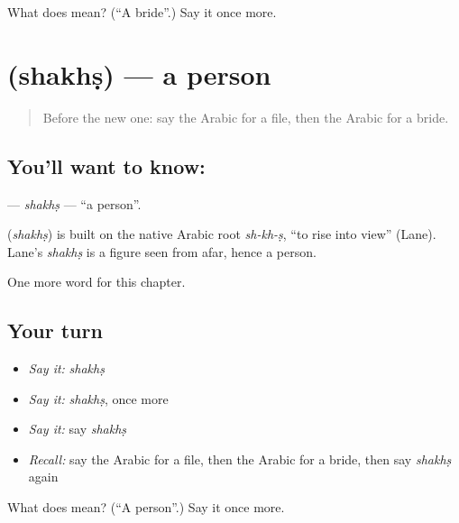 \begin{tcolorbox}[breakable,colback=teal!4,colframe=teal!35!black,title={Before you move on}]
What does  mean? (\textquotedblleft{}A bride\textquotedblright{}.) Say it once more.
\end{tcolorbox}
\section[\texorpdfstring{\ar{شخص} (shakhṣ)}{شخص (shakhṣ)}]{ (shakhṣ) — a person}

\label{lesson:AR-C275-shakhs}



\begin{quote}
Before the new one: say the Arabic for a file, then the Arabic for a bride.
\end{quote}

\subsection*{You'll want to know: }
\textbf{} — \emph{shakhṣ} — \textquotedblleft{}a person\textquotedblright{}.

\begin{cousinweb}
\textbf{} (\emph{shakhṣ}) is built on the native Arabic root \emph{sh-kh-ṣ}, \textquotedblleft{}to rise into view\textquotedblright{} (Lane). Lane's \emph{shakhṣ} is a figure seen from afar, hence a person.
\end{cousinweb}

\begin{grammarlens}[title={What you've built}]
One more word for this chapter.
\end{grammarlens}

\subsection*{Your turn}
\begin{itemize}
\raggedright
  \item \emph{Say it:} \emph{shakhṣ}
  \item \emph{Say it:} \emph{shakhṣ}, once more
  \item \emph{Say it:} say \emph{shakhṣ}
  \item \emph{Recall:} say the Arabic for a file, then the Arabic for a bride, then say \emph{shakhṣ} again
\end{itemize}

\begin{tcolorbox}[breakable,colback=teal!4,colframe=teal!35!black,title={Before you move on}]
What does  mean? (\textquotedblleft{}A person\textquotedblright{}.) Say it once more.
\end{tcolorbox}
